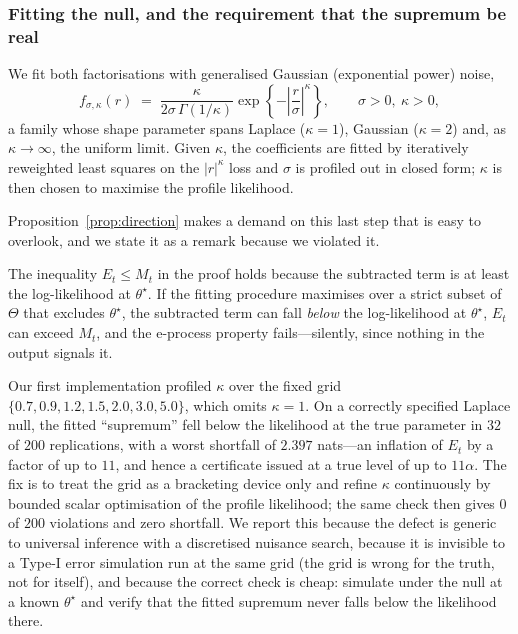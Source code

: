 \subsubsection{Fitting the null, and the requirement that the supremum be real}
\label{sec:supremum}

We fit both factorisations with generalised Gaussian (exponential power)
noise,
\begin{equation}\label{eq:gg}
f_{\sigma,\kappa}(r) \;=\;
  \frac{\kappa}{2\sigma\,\Gamma(1/\kappa)}
  \exp\!\left\{ -\left|\frac{r}{\sigma}\right|^{\kappa} \right\},
\qquad \sigma > 0, \ \kappa > 0,
\end{equation}
a family \citep{subbotin1923law,box1973bayesian} whose shape parameter spans
Laplace ($\kappa = 1$), Gaussian ($\kappa = 2$) and, as
$\kappa \to \infty$, the uniform limit. Given $\kappa$, the coefficients are
fitted by iteratively reweighted least squares on the $|r|^\kappa$ loss and
$\sigma$ is profiled out in closed form; $\kappa$ is then chosen to maximise
the profile likelihood.

Proposition~\ref{prop:direction} makes a demand on this last step that is easy
to overlook, and we state it as a remark because we violated it.

\begin{remark}\label{rem:supremum}
The inequality $E_t \le M_t$ in the proof holds because the subtracted term is
at least the log-likelihood at $\theta^\star$. If the fitting procedure
maximises over a strict subset of $\Theta$ that excludes $\theta^\star$, the
subtracted term can fall \emph{below} the log-likelihood at $\theta^\star$,
$E_t$ can exceed $M_t$, and the e-process property fails---silently, since
nothing in the output signals it.

Our first implementation profiled $\kappa$ over the fixed grid
$\{0.7, 0.9, 1.2, 1.5, 2.0, 3.0, 5.0\}$, which omits $\kappa = 1$. On a
correctly specified Laplace null, the fitted ``supremum'' fell below the
likelihood at the true parameter in $32$ of $200$ replications, with a worst
shortfall of $2.397$ nats---an inflation of $E_t$ by a factor of up to $11$,
and hence a certificate issued at a true level of up to $11\alpha$. The fix is
to treat the grid as a bracketing device only and refine $\kappa$ continuously
by bounded scalar optimisation of the profile likelihood; the same check then
gives $0$ of $200$ violations and zero shortfall. We report this because the
defect is generic to universal inference with a discretised nuisance search,
because it is invisible to a Type-I error simulation run at the same grid (the
grid is wrong for the truth, not for itself), and because the correct check is
cheap: simulate under the null at a known $\theta^\star$ and verify that the
fitted supremum never falls below the likelihood there.
\end{remark}

